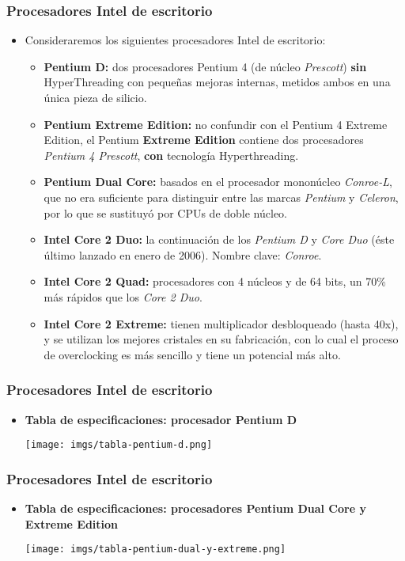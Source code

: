 \frame
{
\frametitle{Procesadores Intel de escritorio}
\begin{itemize}
\item Consideraremos los siguientes procesadores Intel de escritorio:
	\begin{itemize}
	\item \textbf{Pentium D:} dos procesadores Pentium 4 (de núcleo \textit{Prescott}) \textbf{sin} HyperThreading con pequeñas mejoras internas, metidos ambos en una única pieza de silicio.
	\item \textbf{Pentium Extreme Edition:} no confundir con el Pentium 4 Extreme Edition, el Pentium \textbf{Extreme Edition} contiene dos procesadores \textit{Pentium 4 Prescott}, \textbf{con} tecnología Hyperthreading.
	\item \textbf{Pentium Dual Core:} basados en el procesador mononúcleo \textit{Conroe-L}, que no era suficiente para distinguir entre las marcas \textit{Pentium} y \textit{Celeron}, por lo que se sustituyó por CPUs de doble núcleo.
	\item \textbf{Intel Core 2 Duo:} la continuación de los \textit{Pentium D} y \textit{Core Duo} (éste último lanzado en enero de 2006). Nombre clave: \textit{Conroe}.
	\item \textbf{Intel Core 2 Quad:} procesadores con 4 núcleos y de 64 bits, un 70\% más rápidos que los \textit{Core 2 Duo}.
	\item \textbf{Intel Core 2 Extreme:} tienen multiplicador desbloqueado (hasta 40x), y se utilizan los mejores cristales en su fabricación, con lo cual el proceso de overclocking es más sencillo y tiene un potencial más alto.
	\end{itemize}
\end{itemize}
}

\frame
{
\frametitle{Procesadores Intel de escritorio}
\begin{itemize}
 \item \textbf{Tabla de especificaciones: procesador \textbf{Pentium D}}
\begin{center}
\texttt{[image: imgs/tabla-pentium-d.png]}
\end{center}
\end{itemize}
}

\frame
{
\frametitle{Procesadores Intel de escritorio}
\begin{itemize}
 \item \textbf{Tabla de especificaciones: procesadores \textbf{Pentium Dual Core y Extreme Edition}}
\begin{center}
\texttt{[image: imgs/tabla-pentium-dual-y-extreme.png]}
\end{center}
\end{itemize}
}

